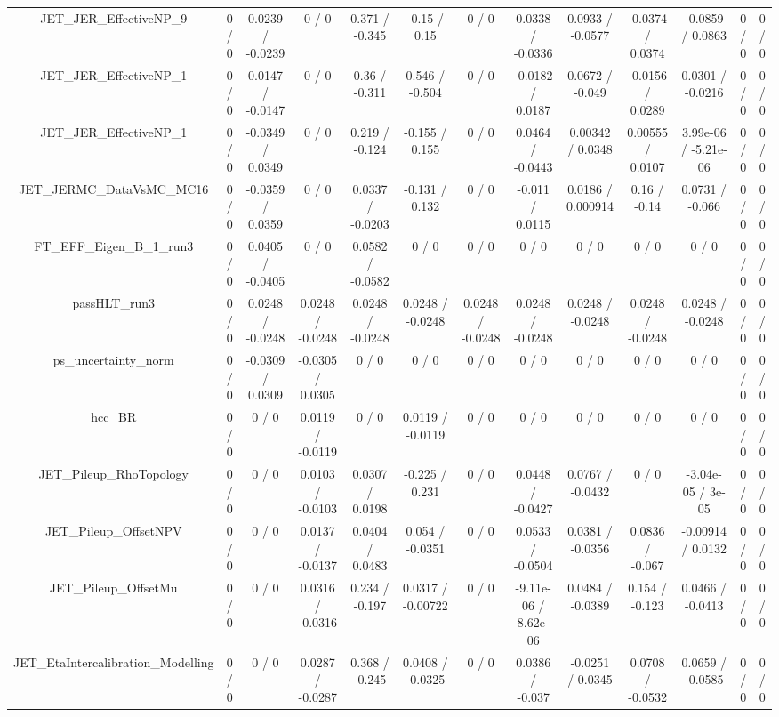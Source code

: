 \documentclass[10pt]{article}
\begin{document}
\begin{table}[htbp]
\begin{center}
\begin{tabular}{|c|c|c|c|c|c|c|c|c|c|c|c|c|}
  JET_JER_EffectiveNP_9 & 0 / 0 & 0.0239 / -0.0239 & 0 / 0 & 0.371 / -0.345 & -0.15 / 0.15 & 0 / 0 & 0.0338 / -0.0336 & 0.0933 / -0.0577 & -0.0374 / 0.0374 & -0.0859 / 0.0863 & 0 / 0 & 0 / 0 \\ 
  JET_JER_EffectiveNP_1 & 0 / 0 & 0.0147 / -0.0147 & 0 / 0 & 0.36 / -0.311 & 0.546 / -0.504 & 0 / 0 & -0.0182 / 0.0187 & 0.0672 / -0.049 & -0.0156 / 0.0289 & 0.0301 / -0.0216 & 0 / 0 & 0 / 0 \\ 
  JET_JER_EffectiveNP_1 & 0 / 0 & -0.0349 / 0.0349 & 0 / 0 & 0.219 / -0.124 & -0.155 / 0.155 & 0 / 0 & 0.0464 / -0.0443 & 0.00342 / 0.0348 & 0.00555 / 0.0107 & 3.99e-06 / -5.21e-06 & 0 / 0 & 0 / 0 \\ 
  JET_JERMC_DataVsMC_MC16 & 0 / 0 & -0.0359 / 0.0359 & 0 / 0 & 0.0337 / -0.0203 & -0.131 / 0.132 & 0 / 0 & -0.011 / 0.0115 & 0.0186 / 0.000914 & 0.16 / -0.14 & 0.0731 / -0.066 & 0 / 0 & 0 / 0 \\ 
  FT_EFF_Eigen_B_1_run3 & 0 / 0 & 0.0405 / -0.0405 & 0 / 0 & 0.0582 / -0.0582 & 0 / 0 & 0 / 0 & 0 / 0 & 0 / 0 & 0 / 0 & 0 / 0 & 0 / 0 & 0 / 0 \\ 
  passHLT_run3 & 0 / 0 & 0.0248 / -0.0248 & 0.0248 / -0.0248 & 0.0248 / -0.0248 & 0.0248 / -0.0248 & 0.0248 / -0.0248 & 0.0248 / -0.0248 & 0.0248 / -0.0248 & 0.0248 / -0.0248 & 0.0248 / -0.0248 & 0 / 0 & 0 / 0 \\ 
  ps_uncertainty_norm & 0 / 0 & -0.0309 / 0.0309 & -0.0305 / 0.0305 & 0 / 0 & 0 / 0 & 0 / 0 & 0 / 0 & 0 / 0 & 0 / 0 & 0 / 0 & 0 / 0 & 0 / 0 \\ 
  hcc_BR & 0 / 0 & 0 / 0 & 0.0119 / -0.0119 & 0 / 0 & 0.0119 / -0.0119 & 0 / 0 & 0 / 0 & 0 / 0 & 0 / 0 & 0 / 0 & 0 / 0 & 0 / 0 \\ 
  JET_Pileup_RhoTopology & 0 / 0 & 0 / 0 & 0.0103 / -0.0103 & 0.0307 / 0.0198 & -0.225 / 0.231 & 0 / 0 & 0.0448 / -0.0427 & 0.0767 / -0.0432 & 0 / 0 & -3.04e-05 / 3e-05 & 0 / 0 & 0 / 0 \\ 
  JET_Pileup_OffsetNPV & 0 / 0 & 0 / 0 & 0.0137 / -0.0137 & 0.0404 / 0.0483 & 0.054 / -0.0351 & 0 / 0 & 0.0533 / -0.0504 & 0.0381 / -0.0356 & 0.0836 / -0.067 & -0.00914 / 0.0132 & 0 / 0 & 0 / 0 \\ 
  JET_Pileup_OffsetMu & 0 / 0 & 0 / 0 & 0.0316 / -0.0316 & 0.234 / -0.197 & 0.0317 / -0.00722 & 0 / 0 & -9.11e-06 / 8.62e-06 & 0.0484 / -0.0389 & 0.154 / -0.123 & 0.0466 / -0.0413 & 0 / 0 & 0 / 0 \\ 
  JET_EtaIntercalibration_Modelling & 0 / 0 & 0 / 0 & 0.0287 / -0.0287 & 0.368 / -0.245 & 0.0408 / -0.0325 & 0 / 0 & 0.0386 / -0.037 & -0.0251 / 0.0345 & 0.0708 / -0.0532 & 0.0659 / -0.0585 & 0 / 0 & 0 / 0 \\ 

\end{tabular}
\end{center}
\end{table}
\end{document}
